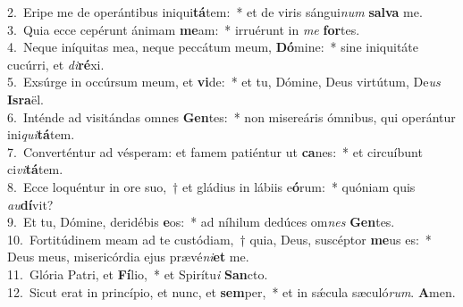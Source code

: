 {2.~}Eripe me de operántibus iniqui\textbf{tá}tem:~* et de viris sángui\textit{num} \textbf{sal}\textbf{va} me.\\
{3.~}Quia ecce cepérunt ánimam \textbf{me}am:~* irruérunt in \textit{me} \textbf{for}tes.\\
{4.~}Neque iníquitas mea, neque peccátum meum, \textbf{Dó}mine:~* sine iniquitáte cucúrri, et \textit{di}\textbf{ré}xi.\\
{5.~}Exsúrge in occúrsum meum, et \textbf{vi}de:~* et tu, Dómine, Deus virtútum, De\textit{us} \textbf{Is}\textbf{ra}ël.\\
{6.~}Inténde ad visitándas omnes \textbf{Gen}tes:~* non misereáris ómnibus, qui operántur ini\textit{qui}\textbf{tá}tem.\\
{7.~}Converténtur ad vésperam: et famem patiéntur ut \textbf{ca}nes:~* et circuíbunt ci\textit{vi}\textbf{tá}tem.\\
{8.~}Ecce loquéntur in ore suo,~† et gládius in lábiis e\textbf{ó}rum:~* quóniam quis \textit{au}\textbf{dí}vit?\\
{9.~}Et tu, Dómine, deridébis \textbf{e}os:~* ad níhilum dedúces om\textit{nes} \textbf{Gen}tes.\\
{10.~}Fortitúdinem meam ad te custódiam,~† quia, Deus, suscéptor \textbf{me}us es:~* Deus meus, misericórdia ejus prævé\textit{ni}\textbf{et} me.\\
{11.~}Glória Patri, et \textbf{Fí}lio,~* et Spirítu\textit{i} \textbf{San}cto.\\
{12.~}Sicut erat in princípio, et nunc, et \textbf{sem}per,~* et in sǽcula sæculó\textit{rum}. \textbf{A}men.\\
